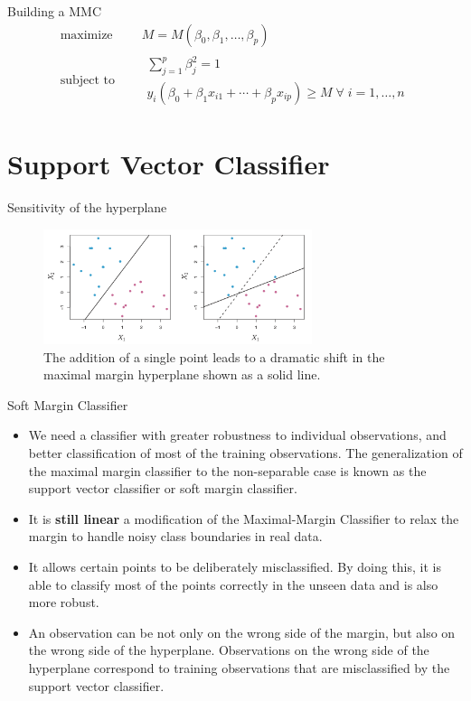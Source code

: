 \documentclass{beamer}
\begin{document}
\begin{frame}{Building a MMC}
  \begin{equation*}
    \begin{aligned}
      \text{maximize } \quad & M=M(\beta_0,\beta_1,\ldots,\beta_p) \\
      \text{subject to }\quad &
      \begin{array}{l}
        \sum_{j=1}^p \beta_j^2 =1 \\
        y_i(\beta_0+\beta_1x_{i1}+\cdots+\beta_p x_{ip})\geq M \; \forall \; i=1,\ldots,n
      \end{array}
    \end{aligned}
  \end{equation*}
\end{frame}

\section{Support Vector Classifier}


\begin{frame}{Sensitivity of the hyperplane}
  \begin{figure}
    \includegraphics[width=0.7\textwidth]{sensitivityhyperplane}
    \caption{The addition of a single point leads to a dramatic shift in the maximal margin hyperplane shown as a solid line\cite{sohil_introduction_2022}.}
  \end{figure}
\end{frame}

\begin{frame}{Soft Margin Classifier}
  \begin{itemize}
  \item  We need a classifier with greater robustness to individual observations, and better classification of most of the training observations.
  The generalization of the maximal margin classifier to the non-separable case is known as the support vector classifier or soft margin classifier.
  \item It is {\bf still linear} a modification of the Maximal-Margin Classifier to relax the margin to handle noisy class boundaries in real data.
  \item It allows certain points to be deliberately misclassified. By doing this, it is able to classify most of the points correctly in the unseen data and is also more robust. 
  \item An observation can be not only on the wrong side of the margin, but also on the wrong side of the hyperplane. Observations on the wrong side of the hyperplane correspond to training observations that are misclassified by the support vector classifier.
  \end{itemize}
\end{frame}
\end{document}
